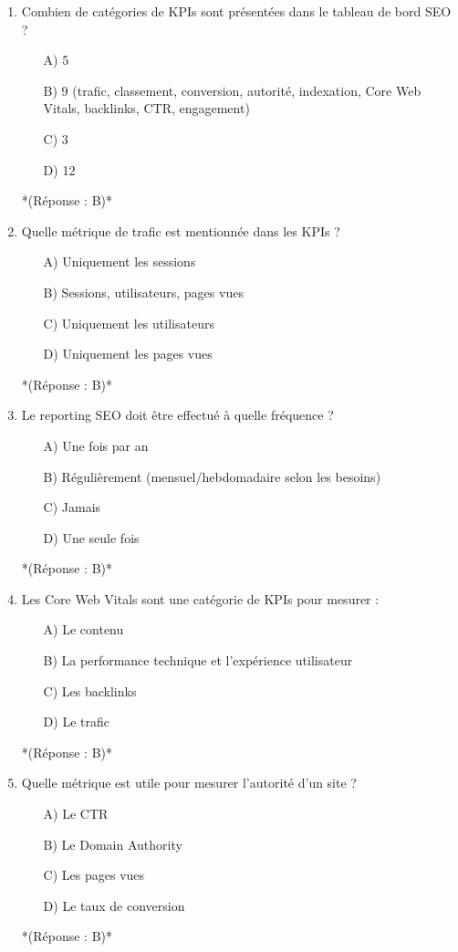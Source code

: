 \documentclass[12pt,a4paper,twoside]{report}
\begin{document}
\begin{enumerate}
    \item Combien de catégories de KPIs sont présentées dans le tableau de bord SEO ?
    \begin{itemize}
        \item[A)] 5
        \item[B)] 9 (trafic, classement, conversion, autorité, indexation, Core Web Vitals, backlinks, CTR, engagement)
        \item[C)] 3
        \item[D)] 12
    \end{itemize}
    *(Réponse : B)*

    \item Quelle métrique de trafic est mentionnée dans les KPIs ?
    \begin{itemize}
        \item[A)] Uniquement les sessions
        \item[B)] Sessions, utilisateurs, pages vues
        \item[C)] Uniquement les utilisateurs
        \item[D)] Uniquement les pages vues
    \end{itemize}
    *(Réponse : B)*

    \item Le reporting SEO doit être effectué à quelle fréquence ?
    \begin{itemize}
        \item[A)] Une fois par an
        \item[B)] Régulièrement (mensuel/hebdomadaire selon les besoins)
        \item[C)] Jamais
        \item[D)] Une seule fois
    \end{itemize}
    *(Réponse : B)*

    \item Les Core Web Vitals sont une catégorie de KPIs pour mesurer :
    \begin{itemize}
        \item[A)] Le contenu
        \item[B)] La performance technique et l'expérience utilisateur
        \item[C)] Les backlinks
        \item[D)] Le trafic
    \end{itemize}
    *(Réponse : B)*

    \item Quelle métrique est utile pour mesurer l'autorité d'un site ?
    \begin{itemize}
        \item[A)] Le CTR
        \item[B)] Le Domain Authority
        \item[C)] Les pages vues
        \item[D)] Le taux de conversion
    \end{itemize}
    *(Réponse : B)*


\end{enumerate}
\end{document}
